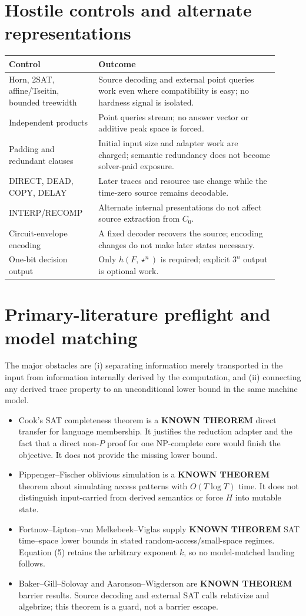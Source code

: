 \documentclass[11pt]{article}
\newcommand{\KNOWN}{\textbf{KNOWN THEOREM}}
\begin{document}
\section{Hostile controls and alternate representations}
\begin{longtable}{p{0.30\linewidth}p{0.61\linewidth}}
\toprule
Control & Outcome\\
\midrule
Horn, 2SAT, affine/Tseitin, bounded treewidth & Source decoding and external point queries work even where compatibility is easy; no hardness signal is isolated.\\
Independent products & Point queries stream; no answer vector or additive peak space is forced.\\
Padding and redundant clauses & Initial input size and adapter work are charged; semantic redundancy does not become solver-paid exposure.\\
DIRECT, DEAD, COPY, DELAY & Later traces and resource use change while the time-zero source remains decodable.\\
INTERP/RECOMP & Alternate internal presentations do not affect source extraction from $C_0$.\\
Circuit-envelope encoding & A fixed decoder recovers the source; encoding changes do not make later states necessary.\\
One-bit decision output & Only $h(F,\star^n)$ is required; explicit $3^n$ output is optional work.\\
\bottomrule
\end{longtable}

\section{Primary-literature preflight and model matching}
The major obstacles are (i) separating information merely transported in the
input from information internally derived by the computation, and (ii)
connecting any derived trace property to an unconditional lower bound in the
same machine model.

\begin{itemize}[leftmargin=*]
\item Cook's SAT completeness theorem is a \KNOWN{} direct transfer for
language membership.  It justifies the reduction adapter and the fact that a
direct non-$P$ proof for one NP-complete core would finish the objective.  It
does not provide the missing lower bound.
\item Pippenger--Fischer oblivious simulation is a \KNOWN{} theorem about
simulating access patterns with $O(T\log T)$ time.  It does not distinguish
input-carried from derived semantics or force $H$ into mutable state.
\item Fortnow--Lipton--van Melkebeek--Viglas supply \KNOWN{} SAT time--space
lower bounds in stated random-access/small-space regimes.  Equation (5) retains
the arbitrary exponent $k$, so no model-matched landing follows.
\item Baker--Gill--Solovay and Aaronson--Wigderson are \KNOWN{} barrier results.
Source decoding and external SAT calls relativize and algebrize; this theorem
is a guard, not a barrier escape.
\end{itemize}
\end{document}
